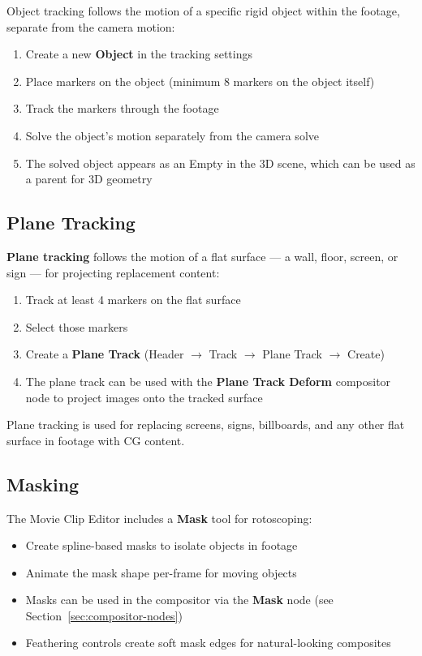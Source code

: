 Object tracking follows the motion of a specific rigid object within the footage, separate from the camera motion:

\begin{enumerate}[leftmargin=2em]
  \item Create a new \textbf{Object} in the tracking settings
  \item Place markers on the object (minimum 8 markers on the object itself)
  \item Track the markers through the footage
  \item Solve the object's motion separately from the camera solve
  \item The solved object appears as an Empty in the 3D scene, which can be used as a parent for 3D geometry
\end{enumerate}

\subsection{Plane Tracking}

\textbf{Plane tracking} follows the motion of a flat surface --- a wall, floor, screen, or sign --- for projecting replacement content:

\begin{enumerate}[leftmargin=2em]
  \item Track at least 4 markers on the flat surface
  \item Select those markers
  \item Create a \textbf{Plane Track} (Header $\rightarrow$ Track $\rightarrow$ Plane Track $\rightarrow$ Create)
  \item The plane track can be used with the \textbf{Plane Track Deform} compositor node to project images onto the tracked surface
\end{enumerate}

Plane tracking is used for replacing screens, signs, billboards, and any other flat surface in footage with CG content.

\subsection{Masking}

The Movie Clip Editor includes a \textbf{Mask} tool for rotoscoping:

\begin{itemize}[leftmargin=2em]
  \item Create spline-based masks to isolate objects in footage
  \item Animate the mask shape per-frame for moving objects
  \item Masks can be used in the compositor via the \textbf{Mask} node (see Section~\ref{sec:compositor-nodes})
  \item Feathering controls create soft mask edges for natural-looking composites
\end{itemize}

